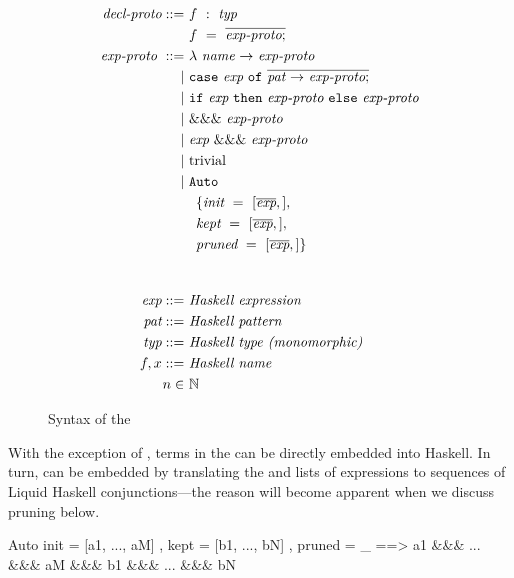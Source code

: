 \begin{figure}
\begin{align*}
  \textit{decl-proto} ::= &
  ~ f ~ : ~ \textit{typ} \\ &
  ~ f ~ = ~ \overline{\textit{exp-proto} ;}
  \\
  \textit{exp-proto}~ ::= &
    ~ \mathtt{\lambda} ~ \textit{name} ~ \mathtt{\rightarrow} ~ \textit{exp-proto} \\ \mid &
    ~ \mathtt{case} ~ \textit{exp} ~ \mathtt{of} ~ \overline{\textit{pat} ~ \mathtt{\rightarrow} ~ \textit{exp-proto} ;} \\ \mid &
    ~ \mathtt{if} ~ \textit{exp} ~ \mathtt{then} ~ \textit{exp-proto} ~ \mathtt{else} ~ \textit{exp-proto} \\ \mid &
    ~ \&\&\& ~ \textit{exp-proto} \\ \mid &
    ~ \textit{exp} ~ \&\&\& ~ \textit{exp-proto} \\ \mid &
    ~ \text{trivial} \\ \mid &
    ~ \mathtt{Auto} \\ &
    ~ \hspace{0.5em} \{ \textit{init}~=~[\overline{\textit{exp}},], \\ &
    ~ \hspace{0.5em} \textit{kept}~=~[\overline{\textit{exp}},], \\ &
    ~ \hspace{0.5em} \textit{pruned}~=~[\overline{\textit{exp}},] \} \\ &
  \\[1em]
  \textit{exp} ::= & ~ \textit{Haskell expression} 
  \\
  \textit{pat} ::= & ~ \textit{Haskell pattern} 
  \\
  \textit{typ} ::= & ~ \textit{Haskell type (monomorphic)} 
  \\
  f, x ::= & ~ \textit{Haskell name} 
  \\
  n \in & ~ \mathbb{N}
\end{align*}
\caption{Syntax of the \LangB}
\label{fig:langb-syntax}
\end{figure}

With the exception of , terms in the \LangB can be directly
embedded into Haskell. In turn,  can be embedded by
translating the  and  lists of expressions to
sequences of Liquid Haskell conjunctions---the reason will become
apparent when we discuss pruning below.
\begin{code}
  Auto { init = [a1, ..., aM]
       , kept = [b1, ..., bN]
       , pruned = _ } ==>
  a1 &&& ... &&& aM &&& b1 &&& ... &&& bN
\end{code}

